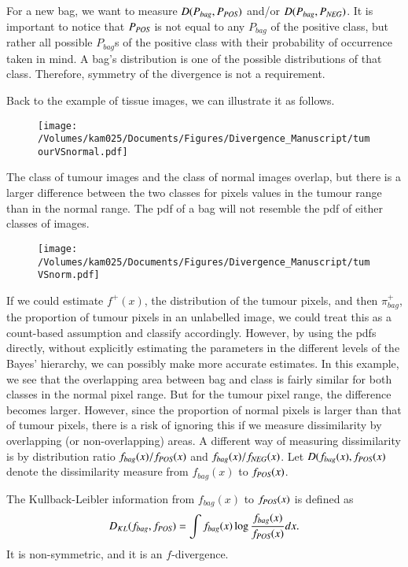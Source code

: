 For a new bag, we want to measure $D(P_{bag},P_{\text{\scriptsize{{\it POS}}}})$ and/or $D(P_{bag},P_{\text{\scriptsize{{\it NEG}}}})$.
It is important to notice that $P_{\text{\scriptsize{{\it POS}}}}$ is not equal to any $P_{bag}$ of the positive class, but rather all possible $P_{bag}$s of the positive class with their probability of occurrence taken in mind. 
A bag's distribution is one of the possible distributions of that class. 
Therefore, symmetry of the divergence is not a requirement.

Back to the example of tissue images, we can illustrate it as follows. 
\begin{figure}[!h]
  \centering
    \texttt{[image: /Volumes/kam025/Documents/Figures/Divergence\_Manuscript/tumourVSnormal.pdf]}
\end{figure}
The class of tumour images and the class of normal images overlap, but there is a larger difference between the two classes for pixels values in the tumour range than in the normal range. 
The pdf of a bag will not resemble the pdf of either classes of images. 
\begin{figure}[!h]
  \centering
    \texttt{[image: /Volumes/kam025/Documents/Figures/Divergence\_Manuscript/tumVSnorm.pdf]}
\end{figure}

If we could estimate $f^+(x)$, the distribution of the tumour pixels, and then $\pi_{bag}^+$, the proportion of tumour pixels in an unlabelled image, we could treat this as a count-based assumption and classify accordingly. 
However, by using the pdfs directly, without explicitly estimating the parameters in the different levels of the Bayes' hierarchy, we can possibly make more accurate estimates. 
In this example, we see that the overlapping area between bag and class is fairly similar for both classes in the normal pixel range. 
But for the tumour pixel range, the difference becomes larger. 
However, since the proportion of normal pixels is larger than that of tumour pixels, there is a risk of ignoring this if we measure dissimilarity by overlapping (or non-overlapping) areas.
A different way of measuring dissimilarity is by distribution ratio $f_{bag}(x) /f_{\text{\scriptsize{{\it POS}}}}(x)$ and $f_{bag}(x) /f_{\text{\scriptsize{{\it NEG}}}}(x)$.
Let $D(f_{bag}(x), f_{\text{\scriptsize{{\it POS}}}}(x)$ denote the dissimilarity measure from $f_{bag}(x)$ to $f_{\text{\scriptsize{{\it POS}}}}(x)$.


The Kullback-Leibler information from $f_{bag}(x)$ to $f_{\text{\scriptsize{{\it POS}}}}(x)$ is defined as
\begin{align}
  D_{KL}(f_{bag},f_{\text{\scriptsize{{\it POS}}}}) = \int f_{bag}(x) \log \frac{f_{bag}(x)}{f_{\text{\scriptsize{{\it POS}}}} (x)} dx.
\end{align}
It is non-symmetric, and it is an $f$-divergence. 


